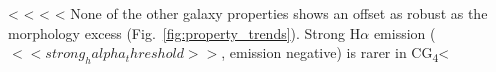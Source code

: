 \documentclass{aa}
\newcommand{\CB}{Control\textsubscript{4B}}
\newcommand{\CC}{Control\textsubscript{4C}}
\newcommand{\CG}{CG\textsubscript{4}}
\newcommand{\RG}{RG\textsubscript{4}}
\begin{document}
<%
<%
<%
<%
None of the other galaxy properties shows an offset as robust as the morphology excess (Fig.~\ref{fig:property_trends}). Strong \(\mathrm{H}\alpha\) emission (\(<< strong_halpha_threshold >>\), emission negative) is rarer in \CG{}<%
\end{document}
